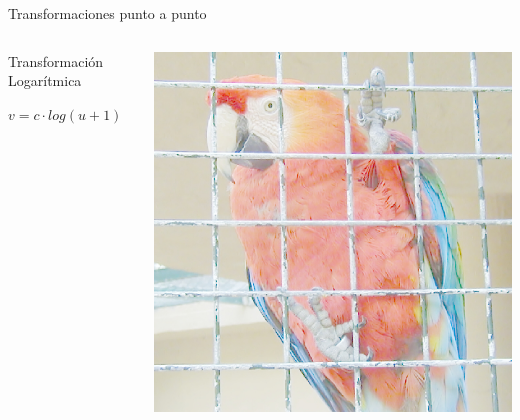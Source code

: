 \documentclass{beamer}
\begin{document}
\begin{frame}{Transformaciones punto a punto}
\begin{columns}
\column[t]{5cm}
\begin{center}
\begin{block}{Transformación Logarítmica} 

\begin{math}
	v = c \cdot log (u + 1)
\end{math}
\end{block}
\end{center}

\begin{center}
\includegraphics[scale=0.15]{./.Presentation/log}
\end{center}


\end{columns}
\end{frame}
\end{document}
